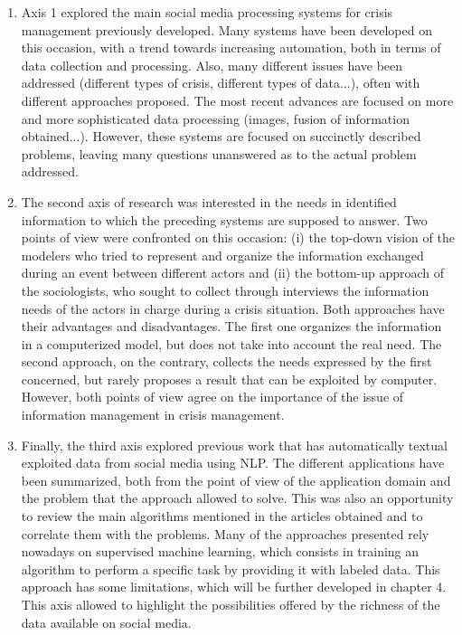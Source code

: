 \begin{enumerate}
    \item Axis 1 explored the main social media processing systems for crisis management previously developed.
          Many systems have been developed on this occasion, with a trend towards increasing automation, both in terms of data collection and processing.
          Also, many different issues have been addressed (different types of crisis, different types of data...), often with different approaches proposed.
          The most recent advances are focused on more and more sophisticated data processing (images, fusion of information obtained...).
          However, these systems are focused on succinctly described problems, leaving many questions unanswered as to the actual problem addressed.
    \item The second axis of research was interested in the needs in identified information to which the preceding systems are supposed to answer.
          Two points of view were confronted on this occasion: (i) the top-down vision of the modelers who tried to represent and organize the information exchanged during an event between different actors and
          (ii) the bottom-up approach of the sociologists, who sought to collect through interviews the information needs of the actors in charge during a crisis situation.
          Both approaches have their advantages and disadvantages. The first one organizes the information in a computerized model, but does not take into account the real need.
          The second approach, on the contrary, collects the needs expressed by the first concerned, but rarely proposes a result that can be exploited by computer.
          However, both points of view agree on the importance of the issue of information management in crisis management.
    \item Finally, the third axis explored previous work that has automatically textual exploited data from social media using NLP.
          The different applications have been summarized, both from the point of view of the application domain and the problem that the approach allowed to solve.
          This was also an opportunity to review the main algorithms mentioned in the articles obtained and to correlate them with the problems.
          Many of the approaches presented rely nowadays on supervised machine learning, which consists in training an algorithm to perform a specific task by providing it with labeled data.
          This approach has some limitations, which will be further developed in chapter 4.
          This axis allowed to highlight the possibilities offered by the richness of the data available on social media.
\end{enumerate}

